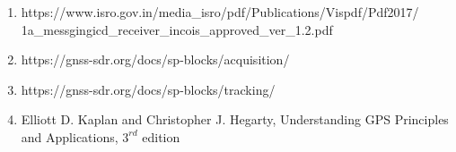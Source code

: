 \begin{enumerate}

	\item https://www.isro.gov.in/media\_isro/pdf/Publications/Vispdf/Pdf2017/\\1a\_messgingicd\_receiver\_incois\_approved\_ver\_1.2.pdf

	\item https://gnss-sdr.org/docs/sp-blocks/acquisition/

	\item https://gnss-sdr.org/docs/sp-blocks/tracking/
   
	\item Elliott D. Kaplan and Christopher J. Hegarty,  Understanding {GPS} {P}rinciples and {A}pplications, $3^{rd}$ edition
\end{enumerate}
\let\cleardoublepage\clearpage  %
